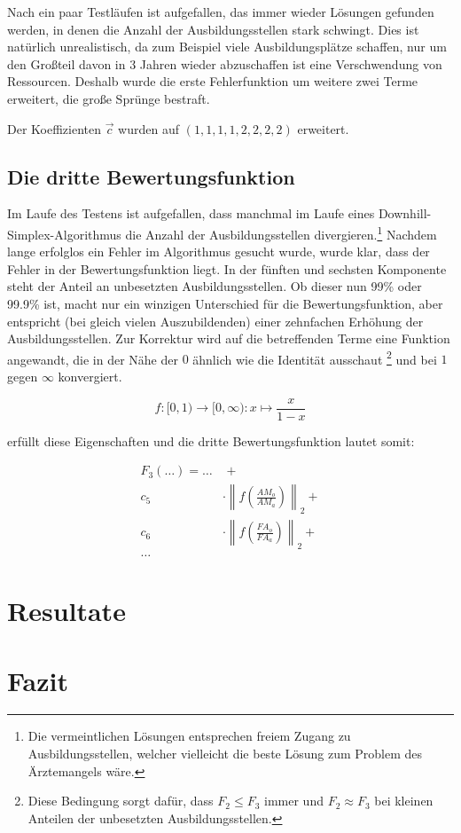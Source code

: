\documentclass[a4paper,12pt]{article}
\begin{document}
Nach ein paar Testläufen ist aufgefallen, das immer wieder Lösungen gefunden werden, in denen die Anzahl der Ausbildungsstellen stark schwingt. Dies ist natürlich unrealistisch, da zum Beispiel viele Ausbildungsplätze schaffen, nur um den Großteil davon in 3 Jahren wieder abzuschaffen ist eine Verschwendung von Ressourcen. Deshalb wurde die erste Fehlerfunktion um weitere zwei Terme erweitert, die große Sprünge bestraft. 

Der Koeffizienten $\vec c$ wurden auf $(1,1,1,1,2,2,2,2)$ erweitert. 

\subsection{Die dritte Bewertungsfunktion}

Im Laufe des Testens ist aufgefallen, dass manchmal im Laufe eines Downhill-Simplex-Algorithmus die Anzahl der Ausbildungsstellen divergieren.\footnote{Die vermeintlichen Lösungen entsprechen freiem Zugang zu Ausbildungsstellen, welcher vielleicht die beste Lösung zum Problem des Ärztemangels wäre.} Nachdem lange erfolglos ein Fehler im Algorithmus gesucht wurde, wurde klar, dass der Fehler in der Bewertungsfunktion liegt. In der fünften und sechsten Komponente steht der Anteil an unbesetzten Ausbildungsstellen. Ob dieser nun 99\% oder 99.9\% ist, macht nur ein winzigen Unterschied für die Bewertungsfunktion,  aber entspricht (bei gleich vielen Auszubildenden) einer zehnfachen Erhöhung der Ausbildungsstellen. Zur Korrektur wird auf die betreffenden Terme eine Funktion angewandt, die in der Nähe der $0$ ähnlich wie die Identität ausschaut \footnote{Diese Bedingung sorgt dafür, dass $F_2 \leq F_3$ immer und $F_2 \approx F_3$ bei kleinen Anteilen der unbesetzten Ausbildungsstellen.} und bei $1$ gegen $\infty$ konvergiert.

\begin{equation*}
f: [0,1) \rightarrow [0,\infty) : x \mapsto \frac{x}{1-x}
\end{equation*}

erfüllt diese Eigenschaften und die dritte Bewertungsfunktion lautet somit:

\begin{align*}
F_3(\hdots) = \hdots & \hspace{4pt} + \\
			c_5 &\cdot \left\| f\left( \frac{AM_o}{AM_a} \right) \right\|_2 +\\
			c_6 &\cdot \left\| f\left( \frac{FA_o}{FA_a} \right) \right\|_2 +\\
			 \hdots &
\end{align*}


%

\section{Resultate}

\section{Fazit}
\end{document}
